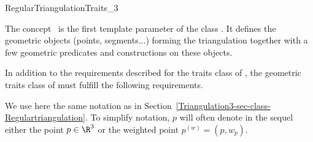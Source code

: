 

\begin{ccRefConcept}{RegularTriangulationTraits_3}

\ccDefinition
The concept \ccRefName\ is the first template parameter of the class
. It defines the geometric objects (points,
segments...) forming the triangulation together with a few geometric
predicates and constructions on these objects.

\ccRefines {}

In addition to the requirements described for the traits class of
, the geometric traits class of
 must fulfill the following requirements.


\ccTypes
{}

\ccGlue
{}
\ccGlue
{}
\ccGlue
{}




We use here the same notation as in
Section~\ref{Triangulation3-sec-class-Regulartriangulation}. 
To simplify notation, $p$ will often denote in the sequel either the
point $p\in\R^3$ or the weighted point ${p}^{(w)}=(p,w_p)$.



\end{ccRefConcept}
